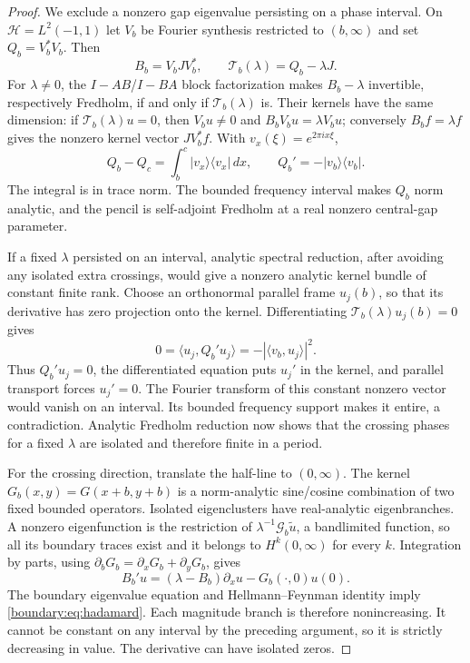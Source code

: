 \begin{proof}
We exclude a nonzero gap eigenvalue persisting on a phase interval.
On $\mathcal H=L^2(-1,1)$ let $V_b$ be Fourier synthesis restricted
to $(b,\infty)$ and set $Q_b=V_b^*V_b$.  Then
\[
 B_b=V_bJV_b^*,\qquad
 \mathcal T_b(\lambda)=Q_b-\lambda J.
\]
For $\lambda\ne0$, the $I-AB$/$I-BA$ block factorization makes
$B_b-\lambda$ invertible, respectively Fredholm, if and only if
$\mathcal T_b(\lambda)$ is.  Their kernels have the same dimension:
if $\mathcal T_b(\lambda)u=0$, then $V_bu\ne0$ and
$B_bV_bu=\lambda V_bu$; conversely $B_bf=\lambda f$ gives the
nonzero kernel vector $JV_b^*f$.
With $v_x(\xi)=e^{2\pi ix\xi}$,
\begin{equation}\label{boundary:eq:covariance-rank-one}
 Q_b-Q_c=\int_b^c|v_x\rangle\langle v_x|\,dx,
 \qquad Q_b'=-|v_b\rangle\langle v_b|.
\end{equation}
The integral is in trace norm.  The bounded frequency interval makes
$Q_b$ norm analytic, and the pencil is self-adjoint Fredholm at a real
nonzero central-gap parameter.

If a fixed $\lambda$ persisted on an interval, analytic spectral
reduction, after avoiding any isolated extra crossings, would give
a nonzero analytic kernel bundle of constant finite rank.
Choose an orthonormal parallel frame $u_j(b)$, so that its derivative
has zero projection onto the kernel.  Differentiating
$\mathcal T_b(\lambda)u_j(b)=0$ gives
\[
 0=\langle u_j,Q_b'u_j\rangle
 =-|\langle v_b,u_j\rangle|^2.
\]
Thus $Q_b'u_j=0$, the differentiated equation puts $u_j'$ in the
kernel, and parallel transport forces $u_j'=0$.
The Fourier transform of this constant nonzero vector would vanish
on an interval.  Its bounded frequency support makes it entire,
a contradiction.  Analytic Fredholm reduction now shows that the
crossing phases for a fixed $\lambda$ are isolated and therefore
finite in a period.

For the crossing direction, translate the half-line to $(0,\infty)$.
The kernel $G_b(x,y)=G(x+b,y+b)$ is a norm-analytic sine/cosine
combination of two fixed bounded operators.  Isolated eigenclusters
have real-analytic eigenbranches.  A nonzero eigenfunction is the
restriction of $\lambda^{-1}\mathcal G_b\widetilde u$, a bandlimited
function, so all its boundary traces exist and it belongs to
$H^k(0,\infty)$ for every $k$.  Integration by parts, using
$\partial_bG_b=\partial_xG_b+\partial_yG_b$, gives
\[
 B_b'u=(\lambda-B_b)\partial_xu-G_b(\cdot,0)u(0).
\]
The boundary eigenvalue equation and Hellmann--Feynman identity imply
\eqref{boundary:eq:hadamard}.  Each magnitude branch is therefore
nonincreasing.  It cannot be constant on any interval by the preceding
argument, so it is strictly decreasing in value.  The derivative can
have isolated zeros.


\end{proof}
